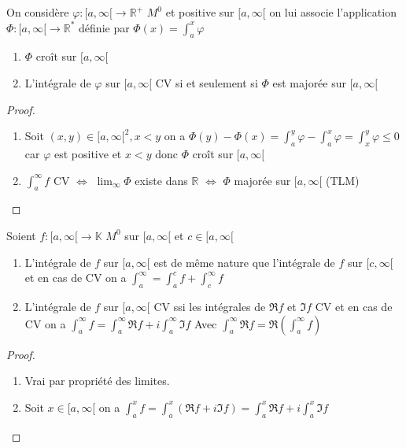 \documentclass[11pt,hidelinks]{book}
\theoremstyle{mytheoremstyle}
\theoremstyle{mytheoremstyle}
\theoremstyle{mytheoremstyle}
\theoremstyle{mytheoremstyle}
\theoremstyle{mytheoremstyle}
\theoremstyle{mytheoremstyle}
\theoremstyle{mytheoremstyle}
\theoremstyle{mytheoremstyle}
\theoremstyle{myproblemstyle}
\def\mbb#1{\mathbb{#1}}
\def\bR{\mbb{R}}
\def\bK{\mbb{K}}
\def\af{[a,\infty[}
\newcommand{\func}[3]{#1\colon#2\to#3}
\newcommand{\parenth}[1]{\left(#1\right)}
\begin{document}
\begin{adjustwidth}{-2em}{-1em}
    \begin{theorem}
        On considère $\func{\varphi}{\af}{\bR^+}$ $M^0$ et positive sur $\af$
        on lui associe l'application $\func{\Phi}{\af}{\bR^*}$ définie par 
        $\Phi(x) = \int_a^x \varphi$
        \begin{enumerate}
            
        \item $\Phi$ croît sur $\af$ 
        \item L'intégrale de $\varphi$ sur $\af$ CV si et seulement si $\Phi$ est majorée sur $\af$
        \end{enumerate}
        \begin{proof}
            \begin{enumerate}
            \item Soit $(x,y) \in \af^2, x < y$ on a $\Phi(y) - \Phi(x) = \int_a^y \varphi - \int_a^x \varphi = \int_x^y \varphi \leq 0$ car $\varphi$ est positive et $x < y$
            donc $\Phi$ croît sur $\af$ 
            \item $\int_a^{\infty} f$ CV $\Leftrightarrow$ $\lim_{\infty} \Phi$ existe dans $\bR$ $\Leftrightarrow$ $\Phi$ majorée sur $\af$ (TLM) 
            \end{enumerate}
        \end{proof}
    \end{theorem}
    \begin{prop}
        Soient $\func{f}{\af}{\bK}$ $M^0$ sur $\af$ et $c \in \af$
        \begin{enumerate}
        \item L'intégrale de $f$ sur $\af$ est de même nature que l'intégrale de $f$ sur $[c,\infty[$ 
        et en cas de CV on a $\int_{a}^{\infty} = \int_{a}^c f + \int_c^{\infty} f$ 
        \item L'intégrale de $f$ sur $\af$ CV ssi les intégrales de $\Re f$ et $\Im f$ CV et en cas de CV on a
        $\int_a^{\infty} f = \int_{a}^{\infty} \Re f + i \int_{a}^{\infty} \Im f$ Avec $\int_{a}^{\infty} \Re f = \Re \parenth{\int_{a}^{\infty} f}$
        \end{enumerate}
        \begin{proof}
            \begin{enumerate}
            \item Vrai par propriété des limites. 
            \item Soit $x \in \af$ on a $\int_{a}^{x} f = \int_{a}^{x} (\Re f + i \Im f) = \int_{a}^{x} \Re f + i \int_{a}^{x} \Im f$ 

\end{enumerate}
\end{proof}
\end{prop}
\end{adjustwidth}
\end{document}
